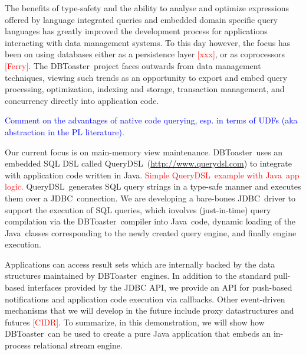 \documentclass{vldb}
\newcommand{\tinysection}[1]{\noindent{\bf #1.}}
\newcommand{\todo}[1]{\textcolor{red}{#1}}
\newcommand{\note}[1]{\textcolor{blue}{#1}}
\newcommand{\compiler}{DBToaster}
\newcommand{\driver}{JDBC}
\newcommand{\targetlang}{Java}
\newcommand{\dsl}{QueryDSL}
\newcommand{\dslurl}{\url{http://www.querydsl.com}}
\begin{document}
\tinysection{Programming with DBToaster} 
The benefits of type-safety and the ability to analyse and optimize expressions
offered by language integrated queries and embedded domain specific query
languages has greatly improved the development process for applications
interacting with data management systems. To this day however, the focus has
been on using databases either as a persistence layer \todo{[xxx]}, or as
coprocessors \todo{[Ferry]}. The \compiler\ project faces outwards from data
management techniques, viewing such trends as an opportunity to export
and embed query processing, optimization, indexing and storage,
transaction management, and concurrency directly into application code.

\note{Comment on the advantages of native code querying, esp. in terms of UDFs
(aka abstraction in the PL literature).}


Our current focus is on main-memory view maintenance. \compiler\ uses an
embedded SQL DSL called \dsl\ (\dslurl) to integrate with application code
written in \targetlang.
\todo{Simple \dsl\ example with \targetlang\ app logic.}
\dsl\ generates SQL query strings in a type-safe manner and executes them
over a \driver\ connection. We are developing a bare-bones \driver\ driver to
support the execution of SQL queries, which involves (just-in-time) query
compilation via the \compiler\ compiler into \targetlang\ code, dynamic loading
of the \targetlang\ classes corresponding to the newly created query engine, and
finally engine execution.


Applications can access
result sets which are internally backed by the data structures maintained by
\compiler\ engines. In addition to the standard pull-based interfaces provided
by the JDBC API, we provide an API for push-based notifications and application
code execution via callbacks. Other event-driven mechanisms that we will develop
in the future include proxy datastructures and futures \todo{[CIDR]}. To
summarize, in this demonstration, we will show how \compiler\ can be used to
create a pure Java application that embeds an in-process relational stream
engine.
\end{document}
